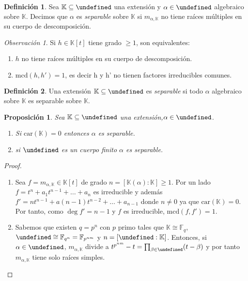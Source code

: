 \documentclass[10pt, spanish]{report}
\newtheorem{prop}[tma]{Proposición}
\theoremstyle{definition}
\newtheorem*{defin}{Definición}
\theoremstyle{custom}
\theoremstyle{remark}
\newtheorem*{obs}{Observación}
\newcommand{\F}{\mathbb{F}}
\newcommand{\K}{\mathbb{K}}
\let\L\undefined
\newcommand{\L}{\mathbb{L}}
\newcommand{\car}[1]{\text{car}(#1)}
\newcommand{\mcd}[1]{\text{mcd}(#1)}
\renewcommand{\geq}{\geqslant}
\newcommand{\fecha}[1]{\marginpar{\underline{\footnotesize{#1}}}}
\begin{document}
\fecha{24/03} %

\begin{defin}
    Sea $\K\subseteq\L$ una extensión y $\alpha\in\L$ algebraico sobre $\K$.
    Decimos que $\alpha$ es \textit{separable} sobre $\K$ si $m_{\alpha,\K}$ no
    tiene raíces múltiples en su cuerpo de descomposición.
\end{defin}

\begin{obs}
    Si $h\in\K[t]$ tiene grado $\geq1$, son equivalentes:
    \begin{enumerate}
        \item $h$ no tiene raíces múltiples en su cuerpo de descomposición.
        \item $\mcd{h,h'}=1$, es decir h y h' no tienen factores irreducibles
            comunes.
    \end{enumerate}
\end{obs}

\begin{defin}
    Una extensión $\K\subseteq\L$ es \textit{separable} si todo $\alpha$
    algebraico sobre $\K$ es separable sobre $\K$.
\end{defin}

\begin{prop}
    Sea $\K\subseteq\L$ una extensión,$\alpha\in\L$.
    \begin{enumerate}
        \item Si $\car\K=0$ entonces $\alpha$ es separable.
        \item si $\L$ es un cuerpo finito $\alpha$ es separable.
    \end{enumerate}
\end{prop}

\begin{proof}\hspace{0pt}
    \begin{enumerate}
        \item Sea $f=m_{\alpha,\K}\in\K[t]$ de grado $n=[\K(\alpha):\K]\geq1$.
            Por un lado $f=t^n+a_1t^{n-1}+\ldots+a_n$ es irreducible y además
            $f'=nt^{n-1}+a(n-1)t^{n-2}+\ldots+a_{n-1}$ donde $n\neq0$ ya que
            $\car\K=0$. Por tanto, como $\deg{f'}=n-1$ y $f$ es irreducible,
            $\mcd{f,f'}=1$.
        \item Sabemos que existen $q=p^n$ con $p$ primo tales que $\K\cong\F_q$,
            $\L\cong\F_{q^n}=\F_{p^{nm}}$ y $n=[\L:\K]$. Entonces, si
            $\alpha\in\L$, $m_{\alpha,\K}$ divide a $t^{p^{nm}}-t=\prod_{\beta
            \in\L}(t-\beta)$ y por tanto $m_{\alpha,\K}$ tiene solo raíces
            simples.
    \end{enumerate}
\end{proof}
\end{document}
